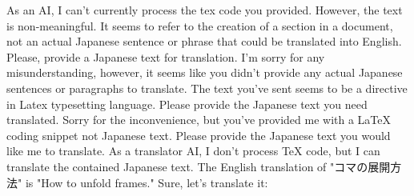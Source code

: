 \relax
\providecommand\hyper@newdestlabel[2]{}


As an AI, I can't currently process the tex code you provided. However, the text is non-meaningful. It seems to refer to the creation of a section in a document, not an actual Japanese sentence or phrase that could be translated into English. Please, provide a Japanese text for translation.
I'm sorry for any misunderstanding, however, it seems like you didn't provide any actual Japanese sentences or paragraphs to translate. The text you've sent seems to be a directive in Latex typesetting language. Please provide the Japanese text you need translated.
Sorry for the inconvenience, but you've provided me with a LaTeX coding snippet not Japanese text. Please provide the Japanese text you would like me to translate.
As a translator AI, I don't process TeX code, but I can translate the contained Japanese text. The English translation of "コマの展開方法" is "How to unfold frames."
Sure, let's translate it:

